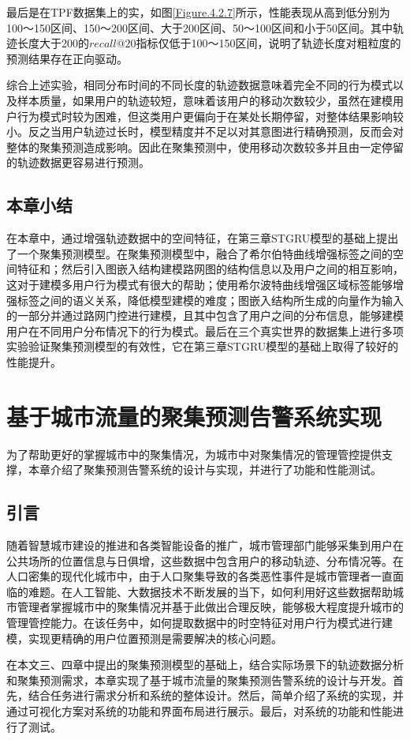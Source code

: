 \documentclass[master]{thesis-uestc}
\begin{document}
最后是在TPF数据集上的实，如图\ref{Figure.4.2.7}所示，性能表现从高到低分别为100～150区间、150～200区间、大于200区间、50～100区间和小于50区间。其中轨迹长度大于200的$recall@20$指标仅低于100～150区间，说明了轨迹长度对粗粒度的预测结果存在正向驱动。

综合上述实验，相同分布时间的不同长度的轨迹数据意味着完全不同的行为模式以及样本质量，如果用户的轨迹较短，意味着该用户的移动次数较少，虽然在建模用户行为模式时较为困难，但这类用户更偏向于在某处长期停留，对整体结果影响较小。反之当用户轨迹过长时，模型精度并不足以对其意图进行精确预测，反而会对整体的聚集预测造成影响。因此在聚集预测中，使用移动次数较多并且由一定停留的轨迹数据更容易进行预测。

\section{本章小结}
在本章中，通过增强轨迹数据中的空间特征，在第三章STGRU模型的基础上提出了一个聚集预测模型。在聚集预测模型中，融合了希尔伯特曲线增强标签之间的空间特征和；然后引入图嵌入结构建模路网图的结构信息以及用户之间的相互影响，这对于建模多用户行为模式有很大的帮助；使用希尔波特曲线增强区域标签能够增强标签之间的语义关系，降低模型建模的难度；图嵌入结构所生成的向量作为输入的一部分并通过路网门控进行建模，且其中包含了用户之间的分布信息，能够建模用户在不同用户分布情况下的行为模式。最后在三个真实世界的数据集上进行多项实验验证聚集预测模型的有效性，它在第三章STGRU模型的基础上取得了较好的性能提升。

\chapter{基于城市流量的聚集预测告警系统实现}
为了帮助更好的掌握城市中的聚集情况，为城市中对聚集情况的管理管控提供支撑，本章介绍了聚集预测告警系统的设计与实现，并进行了功能和性能测试。

\section{引言}
随着智慧城市建设的推进和各类智能设备的推广，城市管理部门能够采集到用户在公共场所的位置信息与日俱增，这些数据中包含用户的移动轨迹、分布情况等。在人口密集的现代化城市中，由于人口聚集导致的各类恶性事件是城市管理者一直面临的难题。在人工智能、大数据技术不断发展的当下，如何利用好这些数据帮助城市管理者掌握城市中的聚集情况并基于此做出合理反映，能够极大程度提升城市的管理管控能力。在该任务中，如何提取数据中的时空特征对用户行为模式进行建模，实现更精确的用户位置预测是需要解决的核心问题。

在本文三、四章中提出的聚集预测模型的基础上，结合实际场景下的轨迹数据分析和聚集预测需求，本章实现了基于城市流量的聚集预测告警系统的设计与开发。首先，结合任务进行需求分析和系统的整体设计。然后，简单介绍了系统的实现，并通过可视化方案对系统的功能和界面布局进行展示。最后，对系统的功能和性能进行了测试。
\end{document}
